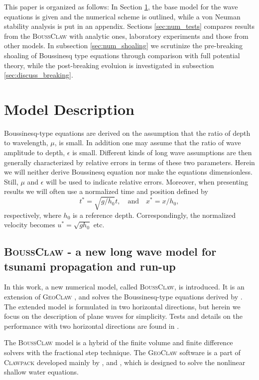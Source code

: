\documentclass[review]{elsarticle}
\newcommand{\BoussClaw}{\textsc{BoussClaw} }
\newcommand{\BoussClawt}{\textsc{BoussClaw}}
\begin{document}
This paper is organized as follows: In Section \ref{sec:model}, the base model
for the wave equations is given and the numerical scheme is outlined,
while a von Neuman stability analysis is put in an appendix. 
Sections \ref{sec:num_tests} compares results from the \BoussClaw with analytic ones, laboratory experiments and those from other models. 
In subsection \ref{sec:num_shoaling} we scrutinize the pre-breaking shoaling of Boussinesq type equations through comparison with full potential theory, while the post-breaking evoluion is investigated in  subsection  \ref{sec:discuss_breaking}.

\section{Model Description}
\label{sec:model}

Boussinesq-type equations are   derived 
on the assumption that the ratio of depth to wavelength, $\mu$,
is small. In addition one may assume that 
the ratio of wave amplitude to depth, $\epsilon$ is small.
Different kinds of long wave assumptions are then generally characterized
by relative errors in terms of these two parameters.
Herein we will neither derive Boussinesq equation nor make the equations 
dimensionless. Still, $\mu$ and $\epsilon$ will be used to indicate relative errors.
Moreover, when presenting results we will often use a normalized time and position defined by 
\begin{equation}
\label{eq:norm_coord}
t^*=\sqrt{g/h_0}t,\quad \mathrm{and}\quad x^*=x/h_0,
\end{equation}
 respectively, where $h_0$ is a reference depth. Correspondingly, the 
normalized velocity becomes $u^*=\sqrt{gh_0}$ etc.

\subsection{\BoussClaw - a new long wave model for tsunami propagation and run-up}
In this work, a new numerical model, 
called \BoussClawt, is introduced. 
It is an extension of \textsc{GeoClaw} \citep{clawpack},
and solves 
the Boussinesq-type equations derived by \citet{schaffer1995further}.
The extended model is formulated in two horizontal directions, 
but herein we focus on the description of plane waves for simplicity. 
Tests and details on the 
performance with two horizontal directions are found in \cite{kim2014finite}.

The \BoussClaw model
is a hybrid of the finite volume and finite difference solvers
with the fractional step technique.
The \textsc{GeoClaw} software is 
a part of \textsc{Clawpack} \citep{clawpack}
developed mainly by
\citet{leveque1997wave}, \citet{george2008augmented}
and \citet{BergerGeorgeLeVequeMandli11},
which is designed to solve the nonlinear shallow water equations.
\end{document}
